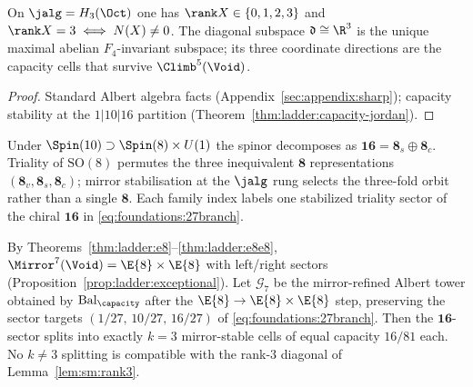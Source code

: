 \begin{lemma}\label{lem:sm:rank3}
On $\jalg=H_3(\Oct)$ one has $\rank X\in\{0,1,2,3\}$ and
$\rank X=3\iff N(X)\neq0$. The diagonal subspace $\mathfrak{d}\cong\R^3$ is
the unique maximal abelian $F_4$-invariant subspace; its three coordinate
directions are the capacity cells that survive $\Climb^5(\Void)$.
\end{lemma}

\begin{proof}
Standard Albert algebra facts (Appendix~\ref{sec:appendix:sharp}); capacity
stability at the $1|10|16$ partition
(Theorem~\ref{thm:ladder:capacity-jordan}).
\end{proof}

\begin{proposition}\label{prop:sm:triality}
Under $\Spin(10)\supset\Spin(8)\times U(1)$ the spinor decomposes as
$\mathbf{16}=\mathbf{8}_s\oplus\mathbf{8}_c$. Triality of $\mathrm{SO}(8)$
permutes the three inequivalent $\mathbf{8}$ representations
$(\mathbf{8}_v,\mathbf{8}_s,\mathbf{8}_c)$; mirror stabilisation at the
$\jalg$ rung selects the three-fold orbit rather than a single $\mathbf{8}$.
Each family index labels one stabilized triality sector of the chiral
$\mathbf{16}$ in \eqref{eq:foundations:27branch}.
\end{proposition}

\begin{proposition}\label{prop:sm:capacity7}
By Theorems~\ref{thm:ladder:e8}--\ref{thm:ladder:e8e8},
$\Mirror^7(\Void)=\E{8}\times\E{8}$ with left/right sectors
(Proposition~\ref{prop:ladder:exceptional}). Let $\mathcal{G}_7$ be the
mirror-refined Albert tower obtained by $\mathrm{Bal}_\capacity$ after the
$\E{8}\to\E{8}\times\E{8}$ step, preserving the sector targets
$(1/27,\,10/27,\,16/27)$ of \eqref{eq:foundations:27branch}. Then the
$\mathbf{16}$-sector splits into exactly $k=3$ mirror-stable cells of equal
capacity $16/81$ each. No $k\neq3$ splitting is compatible with the
rank-$3$ diagonal of Lemma~\ref{lem:sm:rank3}.
\end{proposition}

